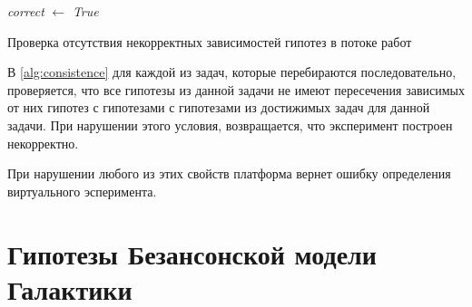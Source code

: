 \begin{algorithm}


    \textit{correct} $\gets$ \textit{True}
    \caption{Проверка отсутствия некорректных зависимостей гипотез в потоке работ}\label{alg:consistence}
\end{algorithm}


В \cref{alg:consistence} для каждой из задач, которые перебираются последовательно, проверяется, что все гипотезы из 
данной задачи не имеют пересечения зависимых от них гипотез с гипотезами с гипотезами из достижимых задач для данной 
задачи. При нарушении этого условия, возвращается, что эксперимент построен некорректно.

При нарушении любого из этих свойств платформа вернет ошибку определения виртуального эсперимента.

\section{Гипотезы Безансонской модели Галактики}
